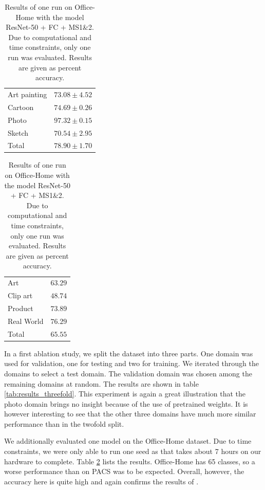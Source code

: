 \begin{table}[t]
    \centering
    \begin{minipage}[t]{0.48\textwidth}
        \centering
        \caption{Results of an ablation study on a threefold split of PACS into train, validation and test set. Results are given as mean $\pm$ standard deviation of percent accuracy. The model used was ResNet-50 + FC + MS1\&2 + FR1.}
        \label{tab:results_threefold}
        \vspace{.5em}
        \begin{tabular}{l | c}
            \toprule
            Art painting & $73.08 \pm 4.52$ \\
            Cartoon & $74.69 \pm 0.26$ \\
            Photo & $97.32 \pm 0.15$ \\
            Sketch & $70.54 \pm 2.95$ \\
            \midrule
            Total & $78.90 \pm 1.70$ \\
            \bottomrule
        \end{tabular}
    \end{minipage}
    \hfill
    \begin{minipage}[t]{0.48\textwidth}
        \centering
        \caption{Results of one run on Office-Home with the model ResNet-50 + FC + MS1\&2. Due to computational and time constraints, only one run was evaluated. Results are given as percent accuracy.}
        \label{tab:results_office-home}
        \vspace{.5em}
        \begin{tabular}{l | c}
            \toprule
            Art & $63.29$ \\
            Clip art & $48.74$ \\
            Product & $73.89$ \\
            Real World & $76.29$ \\
            \midrule
            Total & $65.55$ \\
            \bottomrule
        \end{tabular}
    \end{minipage}
\end{table}

In a first ablation study, we split the dataset into three parts. One domain was used for validation, one for testing and two for training. We iterated through the domains to select a test domain. The validation domain was chosen among the remaining domains at random. The results are shown in table \ref{tab:results_threefold}. This experiment is again a great illustration that the photo domain brings no insight because of the use of pretrained weights. It is however interesting to see that the other three domains have much more similar performance than in the twofold split.

We additionally evaluated one model on the Office-Home dataset. Due to time constraints, we were only able to run one seed as that takes about 7 hours on our hardware to complete. Table \ref{tab:results_office-home} lists the results. Office-Home has 65 classes, so a worse performance than on PACS was to be expected. Overall, however, the accuracy here is quite high and again confirms the results of \cite{mixstyle_ref}.
